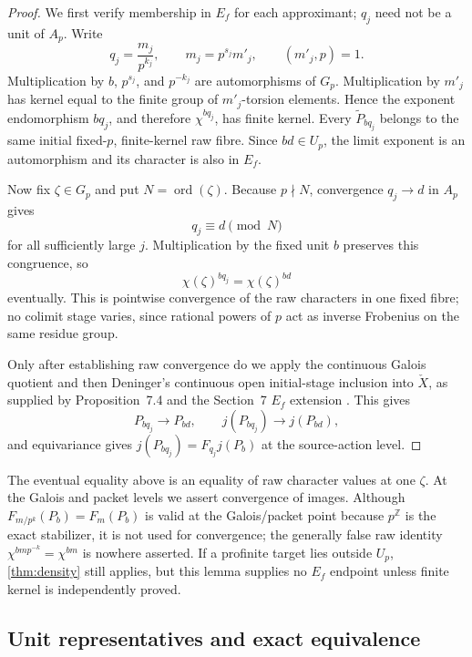 \documentclass[11pt]{article}
\theoremstyle{definition}
\newcommand{\Z}{\mathbb{Z}}
\begin{document}
\begin{proof}
We first verify membership in \(E_f\) for each approximant; \(q_j\) need not be a unit of \(A_p\).  Write
\[
 q_j=\frac{m_j}{p^{k_j}},\qquad m_j=p^{s_j}m'_j,\qquad (m'_j,p)=1.
\]
Multiplication by \(b\), \(p^{s_j}\), and \(p^{-k_j}\) are automorphisms of \(G_p\).  Multiplication by \(m'_j\) has kernel equal to the finite group of \(m'_j\)-torsion elements.  Hence the exponent endomorphism \(bq_j\), and therefore \(\chi^{bq_j}\), has finite kernel.  Every \(\widetilde P_{bq_j}\) belongs to the same initial fixed-\(p\), finite-kernel raw fibre.  Since \(bd\in U_p\), the limit exponent is an automorphism and its character is also in \(E_f\).

Now fix \(\zeta\in G_p\) and put \(N=\operatorname{ord}(\zeta)\).  Because \(p\nmid N\), convergence \(q_j\to d\) in \(A_p\) gives
\[
 q_j\equiv d\pmod N
\]
for all sufficiently large \(j\).  Multiplication by the fixed unit \(b\) preserves this congruence, so
\[
 \chi(\zeta)^{bq_j}=\chi(\zeta)^{bd}
\]
eventually.  This is pointwise convergence of the raw characters in one fixed fibre; no colimit stage varies, since rational powers of \(p\) act as inverse Frobenius on the same residue group.

Only after establishing raw convergence do we apply the continuous Galois quotient and then Deninger's continuous open initial-stage inclusion into \(\check X\), as supplied by Proposition~7.4 and the Section~7 \(E_f\) extension \cite[Proposition~7.4, physical p.~43; finite-kernel discussion, physical p.~47]{Deninger2026}.  This gives
\[
 P_{bq_j}\longrightarrow P_{bd},
 \qquad
 j(P_{bq_j})\longrightarrow j(P_{bd}),
\]
and equivariance gives \(j(P_{bq_j})=F_{q_j}j(P_b)\) at the source-action level.
\end{proof}

The eventual equality above is an equality of raw character values at one \(\zeta\).  At the Galois and packet levels we assert convergence of images.  Although \(F_{m/p^k}(P_b)=F_m(P_b)\) is valid at the Galois/packet point because \(p^{\Z}\) is the exact stabilizer, it is not used for convergence; the generally false raw identity \(\chi^{bmp^{-k}}=\chi^{bm}\) is nowhere asserted.  If a profinite target lies outside \(U_p\), \cref{thm:density} still applies, but this lemma supplies no \(E_f\) endpoint unless finite kernel is independently proved.

\subsection{Unit representatives and exact equivalence}
\end{document}

